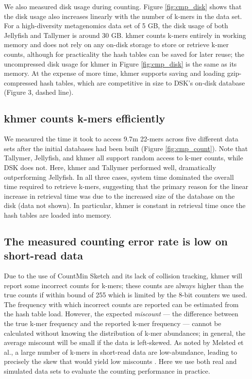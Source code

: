 \documentclass[10pt]{article}
\begin{document}
We also measured disk usage during counting.
Figure \ref{fig:cmp_disk} shows that
the disk usage also increases linearly with the number of k-mers in the
data set.
For a high-diversity metagenomics
data set of 5 GB, the disk usage of both Jellyfish and Tallymer is
around 30 GB.  khmer counts k-mers entirely in working memory and does
not rely on any on-disk storage to store or retrieve k-mer counts,
although for practicality the hash tables can be saved for later
reuse; the uncompressed disk usage for khmer in Figure \ref{fig:cmp_disk}
is the same as its memory.  At the expense of more time, khmer
supports saving and loading gzip-compressed hash tables, which are
competitive in size to DSK's on-disk database (Figure 3, dashed line).

\subsection*{khmer counts k-mers efficiently}

We measured the time it took to access 9.7m 22-mers across five
different data sets after the initial databases had been built (Figure
\ref{fig:cmp_count}).  Note that Tallymer, Jellyfish, and khmer all
support random access to k-mer counts, while DSK does not. Here,
khmer and Tallymer performed well, dramatically outperforming
Jellyfish.  In all three cases, system time dominated the overall time
required to retrieve k-mers, suggesting that the primary reason for
the linear increase in retrieval time was due to the increased size of
the database on the disk (data not shown).  In particular, khmer is
constant in retrieval time once the hash tables are loaded into
memory.

\subsection*{The measured counting error rate is low on short-read data}

Due to the use of CountMin Sketch and its lack of collision tracking,
khmer will report some incorrect counts for k-mers; these counts are
always higher than the true counts if within bound of 255 which is limited by 
the 8-bit counters we used. The frequency with which 
 incorrect counts are reported can be estimated from the hash table
load.  However, the expected {\em miscount} --- the difference
between the true k-mer frequency and the reported k-mer frequency --- cannot be
calculated without knowing the distribution of k-mer abundances; in
general, the average miscount will be small if the data is
left-skewed.  As noted by Melsted et al., a large number of k-mers in
short-read data are low-abundance, leading to precisely the skew
that would yield low miscounts \cite{Melsted2011}.  Here we use both
real and simulated data sets to evaluate the counting performance in
practice.
\end{document}
